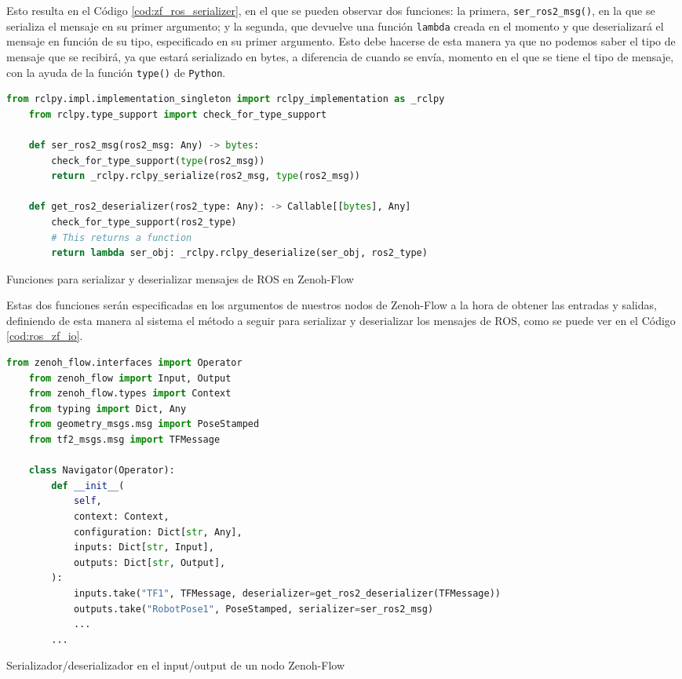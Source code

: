 Esto resulta en el Código \ref{cod:zf_ros_serializer}, en el que se pueden
observar dos funciones: la primera, \verb|ser_ros2_msg()|, en la que se
serializa el mensaje en su primer argumento; y la segunda, que devuelve una
función \verb|lambda| creada en el momento y que deserializará el mensaje en
función de su tipo, especificado en su primer argumento.
Esto debe hacerse de esta manera ya que no podemos saber el tipo de mensaje que
se recibirá, ya que estará serializado en bytes, a diferencia de cuando se
envía, momento en el que se tiene el tipo de mensaje, con la ayuda de la función
\verb|type()| de \texttt{Python}.
\\

\begin{code}[h!]
  \begin{lstlisting}[language=Python]
    from rclpy.impl.implementation_singleton import rclpy_implementation as _rclpy
    from rclpy.type_support import check_for_type_support

    def ser_ros2_msg(ros2_msg: Any) -> bytes:
        check_for_type_support(type(ros2_msg))
        return _rclpy.rclpy_serialize(ros2_msg, type(ros2_msg))

    def get_ros2_deserializer(ros2_type: Any): -> Callable[[bytes], Any]
        check_for_type_support(ros2_type)
        # This returns a function
        return lambda ser_obj: _rclpy.rclpy_deserialize(ser_obj, ros2_type)
  \end{lstlisting}
\caption[Funciones para serializar y deserializar mensajes de ROS en Zenoh-Flow]{Funciones para serializar y deserializar mensajes de ROS en Zenoh-Flow}
\label{cod:zf_ros_serializer}
\end{code}

Estas dos funciones serán especificadas en los argumentos de nuestros nodos de
Zenoh-Flow a la hora de obtener las entradas y salidas, definiendo de esta
manera al sistema el método a seguir para serializar y deserializar los mensajes
de ROS, como se puede ver en el Código \ref{cod:ros_zf_io}.
\\

\begin{code}[h!]
  \begin{lstlisting}[language=Python]
    from zenoh_flow.interfaces import Operator
    from zenoh_flow import Input, Output
    from zenoh_flow.types import Context
    from typing import Dict, Any
    from geometry_msgs.msg import PoseStamped
    from tf2_msgs.msg import TFMessage

    class Navigator(Operator):
        def __init__(
            self,
            context: Context,
            configuration: Dict[str, Any],
            inputs: Dict[str, Input],
            outputs: Dict[str, Output],
        ):
            inputs.take("TF1", TFMessage, deserializer=get_ros2_deserializer(TFMessage))
            outputs.take("RobotPose1", PoseStamped, serializer=ser_ros2_msg)
            ...
        ...
  \end{lstlisting}
\caption[Serializador/deserializador en los input/output de un nodo Zenoh-Flow]{Serializador/deserializador en el input/output de un nodo Zenoh-Flow}
\label{cod:ros_zf_io}
\end{code}

